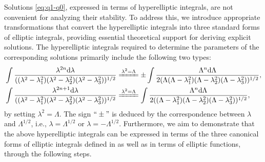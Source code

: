 \documentclass[11pt,reqno]{amsart}
\newcommand{\dd}{\mathrm{d}}
\numberwithin{equation}{section}
\begin{document}
Solutions \eqref{eq:q1-q0}, expressed in terms of hyperelliptic integrals, are not convenient for analyzing their stability. To address this, we introduce appropriate transformations that convert the hyperelliptic integrals into three standard forms of elliptic integrals, providing essential theoretical support for deriving explicit solutions. The hyperelliptic integrals required to determine the parameters of the corresponding solutions primarily include the following two types:
\begin{subequations} \label{eq:hyper}
	\begin{align}
		&\int \frac{\lambda^{2n}\dd \lambda }{((\lambda^2-\lambda_1^2)(\lambda^2-\lambda_2^2)(\lambda^2-\lambda_3^2))^{1/2}}\xlongequal{\lambda^2=\Lambda}\pm\int \frac{\Lambda^n\dd \Lambda}{2(\Lambda (\Lambda-\lambda_1^2)(\Lambda-\lambda_2^2)(\Lambda-\lambda_3^2))^{1/2}}, \label{eq:hyper-1}\\
		& \int \frac{\lambda^{2n+1}\dd \lambda }{((\lambda^2-\lambda_1^2)(\lambda^2-\lambda_2^2)(\lambda^2-\lambda_3^2))^{1/2}} \xlongequal{\lambda^2=\Lambda}\int \frac{\Lambda^n\dd \Lambda }{2((\Lambda-\lambda_1^2)(\Lambda-\lambda_2^2)(\Lambda-\lambda_3^2))^{1/2}}, \label{eq:hyper-2}
	\end{align}
\end{subequations}
by setting $\lambda^2=\Lambda$.
The sign $``\pm"$ is deduced by the correspondence between $\lambda$ and $\Lambda^{1/2}$, i.e., $\lambda=\Lambda^{1/2}$ or $\lambda=-\Lambda^{1/2}$.
Furthermore, we aim to demonstrate that the above hyperelliptic integrals can be expressed in terms of the three canonical forms of elliptic integrals defined in  as well as in terms of elliptic functions, through the following steps.
\end{document}
